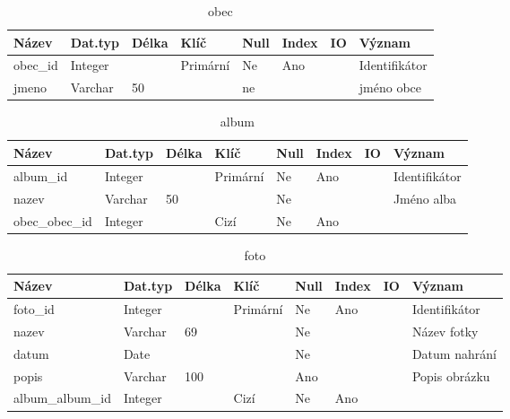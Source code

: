 \documentclass[12pt]{article}
\begin{document}
\begin{enumerate}
\begin{enumerate}[label*=\arabic*.]
		\begin{table}[htp]
				\caption{obec}
				\begin{tabularx}{1.25\textwidth}{|P{3.5cm}|p{1.6cm}|p{1.2cm}|p{1.6cm}|p{1cm}|p{1.2cm}|p{1cm}|X|}
					\hline
					\textbf{Název}& \textbf{Dat.typ} & \textbf{Délka} & \textbf{Klíč} & \textbf{Null}&\textbf{Index}& \textbf{IO}& \textbf{Význam} \\
					\hline
					obec\_id&Integer&&Primární&Ne&Ano&&Identifikátor\\
					\hline
					jmeno&Varchar&50&&ne&&&jméno obce\\
					\hline					
				\end{tabularx}
			\end{table}

		\begin{table}[htp]
			\caption{album}
			\begin{tabularx}{1.25\textwidth}{|P{3.5cm}|p{1.6cm}|p{1.2cm}|p{1.6cm}|p{1cm}|p{1.2cm}|p{1cm}|X|}
				\hline
				\textbf{Název}& \textbf{Dat.typ} & \textbf{Délka} & \textbf{Klíč} & \textbf{Null}&\textbf{Index}& \textbf{IO}& \textbf{Význam} \\
				\hline
				album\_id&Integer&&Primární&Ne&Ano&&Identifikátor\\
				\hline
				nazev&Varchar&50&&Ne&&&Jméno alba\\
				\hline
				obec\_obec\_id&Integer&&Cizí&Ne&Ano&&\\
				\hline
			\end{tabularx}
		\end{table}
	
		\begin{table}[htp]
			\caption{foto}
			\begin{tabularx}{1.25\textwidth}{|P{3.5cm}|p{1.6cm}|p{1.2cm}|p{1.6cm}|p{1cm}|p{1.2cm}|p{1cm}|X|}
				\hline
				\textbf{Název}& \textbf{Dat.typ} & \textbf{Délka} & \textbf{Klíč} & \textbf{Null}&\textbf{Index}& \textbf{IO}& \textbf{Význam} \\
				\hline
				foto\_id&Integer&&Primární&Ne&Ano&&Identifikátor\\
				\hline
				nazev&Varchar&69&&Ne&&&Název fotky\\
				\hline
				datum&Date&&&Ne&&&Datum nahrání\\
				\hline
				popis&Varchar&100&&Ano&&&Popis obrázku\\
				\hline
				album\_album\_id&Integer&&Cizí&Ne&Ano&&\\
				\hline				
			\end{tabularx}
		\end{table}


\end{enumerate}
\end{enumerate}
\end{document}
